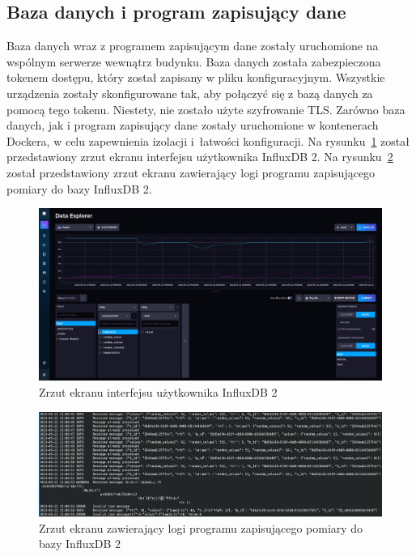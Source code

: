 \subsection{Baza danych i program zapisujący dane}
Baza danych wraz z programem zapisującym dane zostały uruchomione na wspólnym serwerze wewnątrz budynku. Baza danych została zabezpieczona tokenem dostępu, który został zapisany w pliku konfiguracyjnym. Wszystkie urządzenia zostały skonfigurowane tak, aby połączyć się z bazą danych za pomocą tego tokenu. Niestety, nie zostało użyte szyfrowanie TLS. Zarówno baza danych, jak i program zapisujący dane zostały uruchomione w kontenerach Dockera, w celu zapewnienia izolacji i~łatwości konfiguracji. Na rysunku~\ref{rys:influxdb-web} został przedstawiony zrzut ekranu interfejsu użytkownika InfluxDB 2. Na rysunku~\ref{rys:logi-connector} został przedstawiony zrzut ekranu zawierający logi programu zapisującego pomiary do bazy InfluxDB 2.

\begin{figure}[b!]
    \begin{center}
        \includegraphics[width=13cm]{pic/influxdb-web.png}
    \end{center}
    \caption{Zrzut ekranu interfejsu użytkownika InfluxDB 2}\label{rys:influxdb-web}
\end{figure}

\begin{figure}[b!]
    \begin{center}
        \includegraphics[width=13cm]{pic/logi-connector.png}
    \end{center}
    \caption{Zrzut ekranu zawierający logi programu zapisującego pomiary do bazy InfluxDB 2}\label{rys:logi-connector}
\end{figure}

